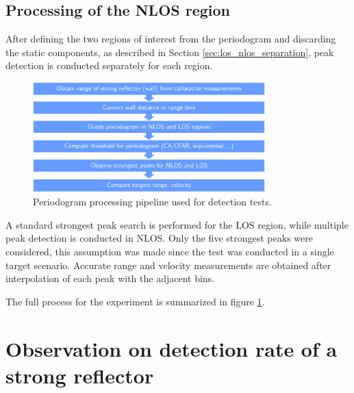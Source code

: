 \subsection{Processing of the NLOS region}

After defining the two regions of interest from the periodogram and discarding the static components, as described in Section \ref{sec:los_nlos_separation}, peak detection is conducted separately for each region. 


\begin{figure}[H]
	\centering
	\includegraphics[width=0.8\textwidth]{Images/Test1/NLOS-proc-pipeline_wide_text12.png}
	\caption{Periodogram processing pipeline used for detection tests.}
	\label{fig:Test1_NLOS-proc-pipeline}
\end{figure}

A standard strongest peak search is performed for the LOS region, while multiple peak detection is conducted in NLOS. Only the five strongest peaks were considered, this assumption was made since the test was conducted in a single target scenario.
Accurate range and velocity measurements are obtained after interpolation of each peak with the adjacent bins.

The full process for the experiment is summarized in figure \ref{fig:Test1_NLOS-proc-pipeline}.



\section{Observation on detection rate of a strong reflector}

